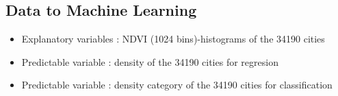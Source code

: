 \documentclass[c]{beamer}
\begin{document}
\subsection{Data to Machine Learning}
\begin{frame}
\tableofcontents[currentsubsection]
\end{frame}

\begin{frame}
 \begin{itemize}
  \item Explanatory variables : NDVI (1024 bins)-histograms of the 34190 cities
  \item Predictable variable : density of the 34190 cities for regresion
  \item Predictable variable : density category of the 34190 cities for classification
 \end{itemize}
 
\begin{columns}
\begin{column}{0.8\textwidth}
\begin{table}
\begin{center}
\begin{adjustbox}{max width=0.9\textwidth}
\begin{tabular}{|c|c|c|c|c|c|c|c|c|c|c|}


\end{tabular}
\end{adjustbox}
\end{center}
\end{table}
\end{column}
\end{columns}
\end{frame}
\end{document}
